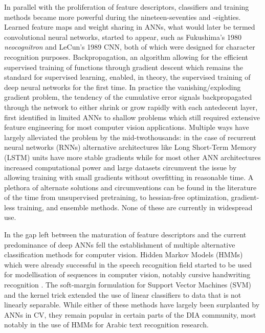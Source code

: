 In parallel with the proliferation of feature descriptors, classifiers and
training methods became more powerful during the nineteen-seventies and
-eighties. Learned feature maps and weight sharing in ANNs, what would later be
termed convolutional neural networks, started to appear, such as Fukushima's
1980 \emph{neocognitron}\cite{fukushima1982neocognitron} and LeCun's 1989
CNN\cite{lecun1989backpropagation}, both of which were designed for character
recognition purposes. Backpropagation\cite{rumelhart1986learning}, an algorithm
allowing for the efficient supervised training of functions through gradient
descent which remains the standard for supervised learning, enabled, in theory,
the supervised training of deep neural networks for the first time. In practice
the vanishing/exploding gradient problem, the tendency of the cumulative error
signals backpropagated through the network to either shrink or grow rapidly
with each antedecent layer, first identified in
\cite{hochreiter1991untersuchungen} limited ANNs to shallow problems which
still required extensive feature engineering for most computer vision
applications. Multiple ways have largely alleviated the problem by the
mid-twothousands: in the case of recurrent neural networks (RNNs) alternative
architectures like Long Short-Term Memory (LSTM) units have more stable
gradients while for most other ANN architectures increased computational power
and large datasets circumvent the issue by allowing training with small
gradients without overfitting in reasonable time. A plethora of alternate
solutions and circumventions can be found in the literature of the time  from
unsupervised pretraining, to hessian-free optimization, gradient-less training,
and ensemble methods\cite[sec. 5.9]{schmidhuber2014deep}. None of these are
currently in widespread use.

In the gap left between the maturation of feature descriptors and the current
predominance of deep ANNs fell the establishment of multiple alternative
classification methods for computer vision. Hidden Markov Models (HMMs) which
were already successful in the speech recognition field started to be used for
modellisation of sequences in computer vision, notably cursive handwriting
recognition \cite{kaltenmeier1993sophisticated}. The soft-margin formulation
for Support Vector Machines (SVM) and the kernel trick extended the use of
linear classifiers to data that is not linearly separable. While either of
these methods have largely been surplanted by ANNs in CV, they remain popular
in certain parts of the DIA community, most notably in the use of HMMs for
Arabic text recognition research.

